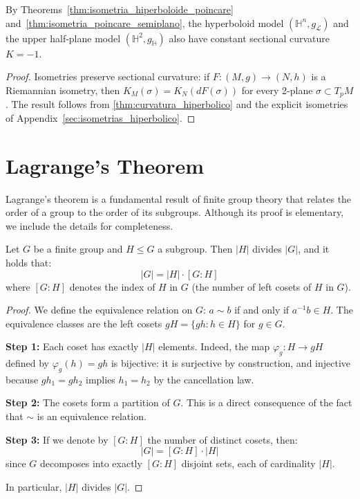 \begin{corollary}\label{cor:curvatura_modelos_hiperbolicos}
By Theorems~\ref{thm:isometria_hiperboloide_poincare} and~\ref{thm:isometria_poincare_semiplano}, the hyperboloid model $(\mathbb{H}^n, g_{\mathcal{L}})$ and the upper half-plane model $(\mathbb{H}^2, g_{\mathbb{H}})$ also have constant sectional curvature $K = -1$.
\end{corollary}

\begin{proof}
Isometries preserve sectional curvature: if $F: (M, g) \to (N, h)$ is a Riemannian isometry, then $K_M(\sigma) = K_N(dF(\sigma))$ for every 2-plane $\sigma \subset T_pM$. The result follows from \autoref{thm:curvatura_hiperbolico} and the explicit isometries of Appendix~\ref{sec:isometrias_hiperbolico}.
\end{proof}

\section{Lagrange's Theorem}\label{sec:lagrange}

Lagrange's theorem is a fundamental result of finite group theory that relates the order of a group to the order of its subgroups. Although its proof is elementary, we include the details for completeness.

\begin{theorem}[Lagrange]\label{thm:lagrange}
Let $G$ be a finite group and $H \leq G$ a subgroup. Then $|H|$ divides $|G|$, and it holds that:
\begin{equation}
|G| = |H| \cdot [G:H]
\end{equation}
where $[G:H]$ denotes the index of $H$ in $G$ (the number of left cosets of $H$ in $G$).
\end{theorem}

\begin{proof}
We define the equivalence relation on $G$: $a \sim b$ if and only if $a^{-1}b \in H$. The equivalence classes are the left cosets $gH = \{gh : h \in H\}$ for $g \in G$.

\textbf{Step 1:} Each coset has exactly $|H|$ elements. Indeed, the map $\varphi_g: H \to gH$ defined by $\varphi_g(h) = gh$ is bijective: it is surjective by construction, and injective because $gh_1 = gh_2$ implies $h_1 = h_2$ by the cancellation law.

\textbf{Step 2:} The cosets form a partition of $G$. This is a direct consequence of the fact that $\sim$ is an equivalence relation.

\textbf{Step 3:} If we denote by $[G:H]$ the number of distinct cosets, then:
\[
|G| = [G:H] \cdot |H|
\]
since $G$ decomposes into exactly $[G:H]$ disjoint sets, each of cardinality $|H|$.

In particular, $|H|$ divides $|G|$.
\end{proof}

